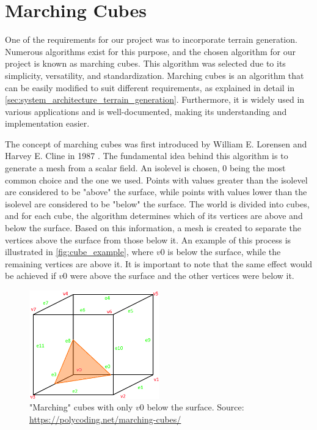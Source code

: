 \section{Marching Cubes} \label{sec:theory_theory_marching_cubes}
One of the requirements for our project was to incorporate terrain generation.
Numerous algorithms exist for this purpose, and the chosen algorithm for our project is known as marching cubes.
This algorithm was selected due to its simplicity, versatility, and standardization.
Marching cubes is an algorithm that can be easily modified to suit different requirements, as explained in detail in \autoref{sec:system_architecture_terrain_generation}.
Furthermore, it is widely used in various applications and is well-documented, making its understanding and implementation easier.

The concept of marching cubes was first introduced by William E. Lorensen and Harvey E. Cline in 1987 \cite{Marching-Cubes}.
The fundamental idea behind this algorithm is to generate a mesh from a scalar field.
An isolevel is chosen, 0 being the most common choice and the one we used.
Points with values greater than the isolevel are considered to be "above" the surface, while points with values lower than the isolevel are considered to be "below" the surface.
The world is divided into cubes, and for each cube, the algorithm determines which of its vertices are above and below the surface.
Based on this information, a mesh is created to separate the vertices above the surface from those below it.
An example of this process is illustrated in \autoref{fig:cube_example}, where $v0$ is below the surface, while the remaining vertices are above it.
It is important to note that the same effect would be achieved if $v0$ were above the surface and the other vertices were below it.

\begin{figure}[H]
    \centering
    \includegraphics[width=0.5\textwidth]{chapters/theoretical_foundations/sections/marching_cubes/resources/cube-example.png}
    \caption["Marching" cubes with only $v0$ below the surface.]{"Marching" cubes with only $v0$ below the surface. Source: \url{https://polycoding.net/marching-cubes/}}
    \label{fig:cube_example}
\end{figure}

